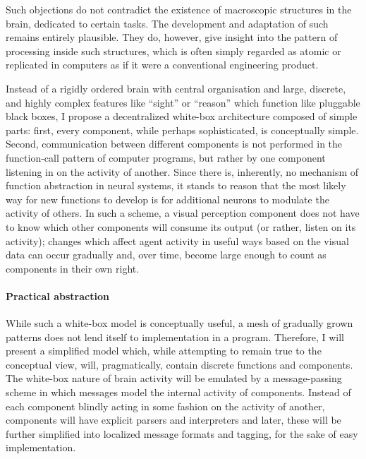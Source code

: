 Such objections do not contradict the existence of macroscopic structures in the brain, dedicated to certain tasks. The development and adaptation of such remains entirely plausible. They do, however, give insight into the pattern of processing inside such structures, which is often simply regarded as atomic or replicated in computers as if it were a conventional engineering product.

Instead of a rigidly ordered brain with central organisation and large, discrete, and highly complex features like ``sight'' or ``reason'' which function like pluggable black boxes, I propose a decentralized white-box architecture composed of simple parts: first, every component, while perhaps sophisticated, is conceptually simple. Second, communication between different components is not performed in the function-call pattern of computer programs, but rather by one component listening in on the activity of another. Since there is, inherently, no mechanism of function abstraction in neural systems, it stands to reason that the most likely way for new functions to develop is for additional neurons to modulate the activity of others. In such a scheme, a visual perception component does not have to know which other components will consume its output (or rather, listen on its activity); changes which affect agent activity in useful ways based on the visual data can occur gradually and, over time, become large enough to count as components in their own right.

\paragraph{Practical abstraction}

While such a white-box model is conceptually useful, a mesh of gradually grown patterns does not lend itself to implementation in a program. Therefore, I will present a simplified model which, while attempting to remain true to the conceptual view, will, pragmatically, contain discrete functions and components. The white-box nature of brain activity will be emulated by a message-passing scheme in which messages model the internal activity of components. Instead of each component blindly acting in some fashion on the activity of another, components will have explicit parsers and interpreters and later, these will be further simplified into localized message formats and tagging, for the sake of easy implementation.